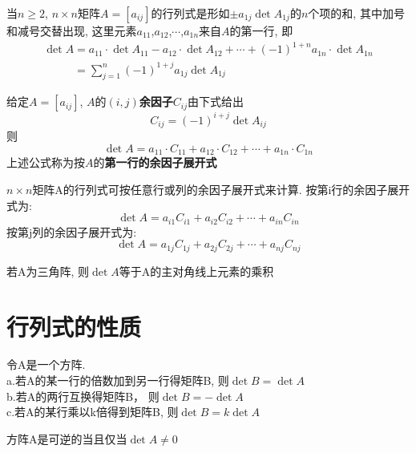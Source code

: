 \begin{definition}
当$n\geqslant 2$, $n\times n$矩阵$A=[a_{ij}]$的行列式是形如$\pm a_{1j}\det A_{1j}$的$n$个项的和, 其中加号和减号交替出现, 这里元素$a_{11}$,$a_{12}$,$\cdots$,$a_{1n}$来自$A$的第一行, 即
\[\begin{array}{l}
\det A=a_{11}\cdot\det A_{11}-a_{12}\cdot\det A_{12}+\cdots+(-1)^{1+n}a_{1n}\cdot\det A_{1n}\\
\phantom{\det A}=\displaystyle\sum_{j=1}^n(-1)^{1+j}a_{1j}\det A_{1j}
\end{array}\]
\end{definition}\vspace{4ex}

给定$A=[a_{ij}]$, $A$的$(i,j)$\textbf{余因子}$C_{ij}$由下式给出
\[C_{ij}=(-1)^{i+j}\det A_{ij}\]
则
\[\det A=a_{11}\cdot C_{11}+a_{12}\cdot C_{12}+\cdots+a_{1n}\cdot C_{1n}\]
上述公式称为按$A$的\textbf{第一行的余因子展开式}\\[2ex]

\begin{TheoremOne}
$n\times n$矩阵A的行列式可按任意行或列的余因子展开式来计算. 按第i行的余因子展开式为:
\[\det A=a_{i1}C_{i1}+a_{i2}C_{i2}+\cdots+a_{in}C_{in}\]
按第j列的余因子展开式为:
\[\det A=a_{1j}C_{1j}+a_{2j}C_{2j}+\cdots+a_{nj}C_{nj}\]
\end{TheoremOne}\vspace{4ex}

\begin{TheoremOne}
若A为三角阵, 则$\det A$等于A的主对角线上元素的乘积
\end{TheoremOne}\vspace{8ex}

\section{行列式的性质}
\begin{TheoremTwo}[行变换]
令A是一个方阵.\\
a.若A的某一行的倍数加到另一行得矩阵B, 则$\det B=\det A$\\
b.若A的两行互换得矩阵B， 则$\det B=-\det A$\\
c.若A的某行乘以k倍得到矩阵B, 则$\det B=k\det A$
\end{TheoremTwo}\vspace{4ex}

\begin{TheoremOne}
方阵A是可逆的当且仅当$\det A\neq0$
\end{TheoremOne}\vspace{4ex}

